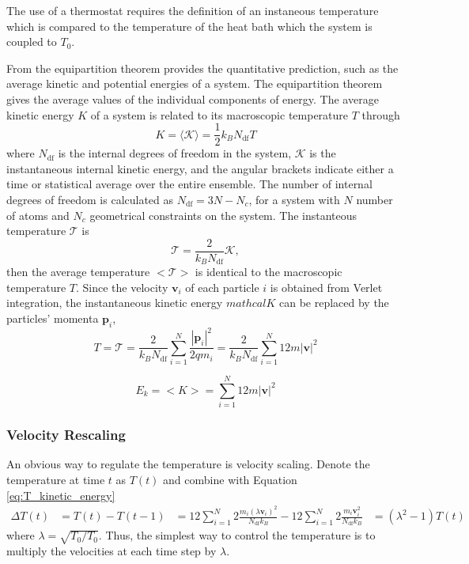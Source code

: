 The use of a thermostat requires the definition of an instaneous temperature which is compared to the temperature of the heat bath which the system is coupled to $T_0$.

From the equipartition theorem provides the quantitative prediction, such as the average kinetic and potential energies of a system.  The equipartition theorem gives the average values of the individual components of energy.  The average kinetic energy $K$ of a system is related to its macroscopic temperature $T$ through
\begin{equation}
  K
  =
  \langle \mathcal{K} \rangle
  =
  \frac{1}
       {2}
  k_B N_{\mathrm{df}} T
\end{equation}
where $N_{\mathrm{df}}$ is the internal degrees of freedom in the system, $\mathcal{K}$ is the instantaneous internal kinetic energy, and the angular brackets indicate either a time or statistical average over the entire ensemble.
The number of internal degrees of freedom is calculated as $N_{\mathrm{df}} = 3 N - N_c$, for a system with $N$ number of atoms and $N_c$ geometrical constraints on the system.
The instanteous temperature $\mathcal{T}$ is
\begin{equation}
  \mathcal{T}
  =
  \frac{2}
       {k_B N_{\mathrm{df}}}
  \mathcal{K},
\end{equation}
then the average temperature $<\mathcal{T}>$ is identical to the macroscopic temperature $T$.  Since the velocity $\bm{v}_i$ of each particle $i$ is obtained from Verlet integration, the instantaneous kinetic energy $mathcal{K}$ can be replaced by the particles' momenta $\bm{p}_i$,
\begin{equation}
  \label{eq:T_kinetic_energy}
  T
  = \mathcal{T}
  = \frac{2}
         {k_B N_{\mathrm{df}}}
    \sum_{i=1}^N \frac{|\bm{p}_i|^2}{2 qm_i}
  = \frac{2}
         {k_B N_{\mathrm{df}}}
         \sum_{i=1}^N {1}{2}m|\bm{v}|^2
\end{equation}

\begin{equation}
  E_k = <K> = \sum_{i=1}^N {1}{2}m|\bm{v}|^2
\end{equation}

\subsubsection{Velocity Rescaling}
An obvious way to regulate the temperature is velocity scaling\cite{tadmor2011_md}.  Denote the temperature at time $t$ as $T(t)$ and combine with Equation \ref{eq:T_kinetic_energy}
\begin{align}
  \Delta T(t)
  &= T(t) - T(t-1)
  &= {1}{2}
     \sum_{i=1}^N 2 \frac{m_i (\lambda \bm{v}_i)^2}
                         {N_{\mathrm{df}} k_B}
     -
     {1}{2}
     \sum_{i=1}^N 2 \frac{m_i \bm{v}_i^2}
                         {N_{\mathrm{df}} k_B}
  &= (\lambda^2 - 1) T(t)
\end{align}
where $\lambda = \sqrt{T_0/T_0}$.  Thus, the simplest way to control the temperature is to multiply the velocities at each time step by $\lambda$.

